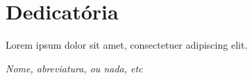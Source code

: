 \chapter*{Dedicatória}
\vfill
\begin{flushleft}

Lorem ipsum dolor sit amet, consectetuer adipiscing elit.

\end{flushleft}
\begin{flushright}
\textit{Nome, abreviatura, ou nada, etc}
\end{flushright}
\vfill